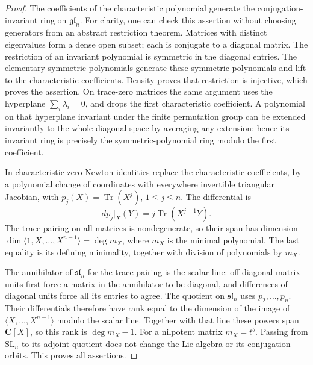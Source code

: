 \documentclass[11pt,a4paper]{article}
\theoremstyle{definition}\newtheorem{definition}[theorem]{Definition}
\theoremstyle{remark}\newtheorem{remark}[theorem]{Remark}
\begin{document}
\begin{proof}
The coefficients of the characteristic polynomial generate
the conjugation-invariant ring on \(\mathfrak{gl}_n\).
For clarity, one can check this assertion without choosing
generators from an abstract restriction theorem. Matrices
with distinct eigenvalues form a dense open subset; each is
conjugate to a diagonal matrix. The restriction of an
invariant polynomial is symmetric in the diagonal entries.
The elementary symmetric polynomials generate these symmetric
polynomials and lift to the characteristic coefficients.
Density proves that restriction is injective, which proves
the assertion. On trace-zero matrices the same argument uses
the hyperplane \(\sum_i\lambda_i=0\), and drops the first
characteristic coefficient. A polynomial on that hyperplane
invariant under the finite permutation group can be extended
invariantly to the whole diagonal space by averaging any
extension; hence its invariant ring is precisely the
symmetric-polynomial ring modulo the first coefficient.

In characteristic zero Newton identities replace the
characteristic coefficients, by a polynomial change of
coordinates with everywhere invertible triangular Jacobian,
with \(p_j(X)=\operatorname{Tr}(X^j)\), \(1\leq j\leq n\).
The differential is
\[
 dp_j|_X(Y)=j\operatorname{Tr}(X^{j-1}Y).
\]
The trace pairing on all matrices is nondegenerate, so their
span has dimension
\(\dim\langle 1,X,\ldots,X^{n-1}\rangle=\deg m_X\),
where \(m_X\) is the minimal polynomial. The last equality
is its defining minimality, together with division of
polynomials by \(m_X\).

The annihilator of \(\mathfrak{sl}_n\) for the trace pairing
is the scalar line: off-diagonal matrix units first force
a matrix in the annihilator to be diagonal, and differences
of diagonal units force all its entries to agree. The
quotient on \(\mathfrak{sl}_n\) uses \(p_2,\ldots,p_n\).
Their differentials therefore have rank equal to the
dimension of the image of \(\langle X,\ldots,X^{n-1}\rangle\)
modulo the scalar line. Together with that line these
powers span \(\mathbf C[X]\), so this rank is
\(\deg m_X-1\). For a nilpotent matrix \(m_X=t^b\).
Passing from \(\mathrm{SL}_n\) to its adjoint quotient
does not change the Lie algebra or its conjugation orbits.
This proves all assertions.
\end{proof}
\end{document}
